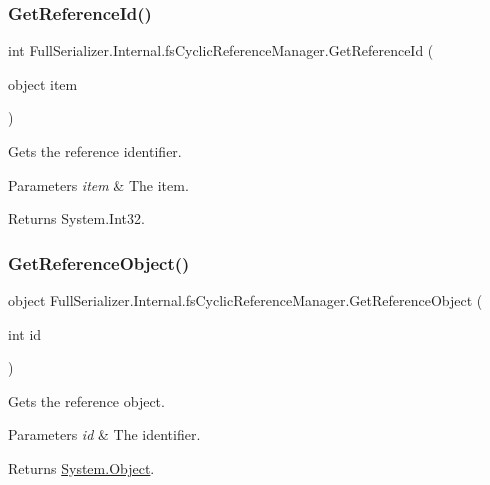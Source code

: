 \subsubsection{\texorpdfstring{Get\+Reference\+Id()}{GetReferenceId()}}
{\footnotesize\ttfamily int Full\+Serializer.\+Internal.\+fs\+Cyclic\+Reference\+Manager.\+Get\+Reference\+Id (\begin{DoxyParamCaption}\item[{object}]{item }\end{DoxyParamCaption})\hspace{0.3cm}{\ttfamily [inline]}}



Gets the reference identifier. 


\begin{DoxyParams}{Parameters}
{\em item} & The item.\\
\hline
\end{DoxyParams}
\begin{DoxyReturn}{Returns}
System.\+Int32.
\end{DoxyReturn}
\mbox{\label{class_full_serializer_1_1_internal_1_1fs_cyclic_reference_manager_a772758af872d1c63827878d587389dda}} 
\subsubsection{\texorpdfstring{Get\+Reference\+Object()}{GetReferenceObject()}}
{\footnotesize\ttfamily object Full\+Serializer.\+Internal.\+fs\+Cyclic\+Reference\+Manager.\+Get\+Reference\+Object (\begin{DoxyParamCaption}\item[{int}]{id }\end{DoxyParamCaption})\hspace{0.3cm}{\ttfamily [inline]}}



Gets the reference object. 


\begin{DoxyParams}{Parameters}
{\em id} & The identifier.\\
\hline
\end{DoxyParams}
\begin{DoxyReturn}{Returns}
\hyperlink{namespace_full_serializer_a6eee33d63b94e40fdfcfc59af9fcfc82a497031794414a552435f90151ac3b54b}{System.\+Object}.
\end{DoxyReturn}

